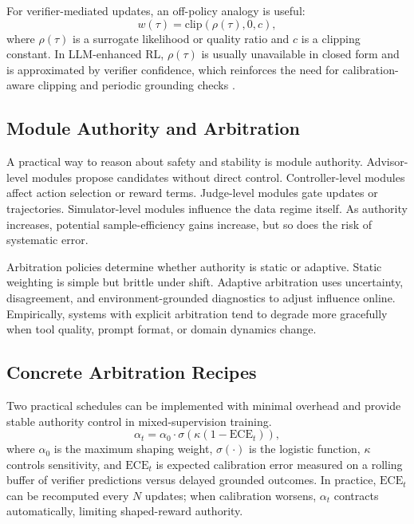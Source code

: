 \documentclass[pdflatex,sn-mathphys-num]{sn-jnl}
\begin{document}
For verifier-mediated updates, an off-policy analogy is useful:
\begin{equation}
w(\tau)=\mathrm{clip}\!\left(\rho(\tau),0,c\right),
\label{eq:clip_importance}
\end{equation}
where $\rho(\tau)$ is a surrogate likelihood or quality ratio and $c$ is a clipping constant. In LLM-enhanced RL, $\rho(\tau)$ is usually unavailable in closed form and is approximated by verifier confidence, which reinforces the need for calibration-aware clipping and periodic grounding checks \cite{arxiv_p_2602_06493,arxiv_p_2602_12579,arxiv_p_2508_03680}.

\subsection{Module Authority and Arbitration}
A practical way to reason about safety and stability is module authority. Advisor-level modules propose candidates without direct control. Controller-level modules affect action selection or reward terms. Judge-level modules gate updates or trajectories. Simulator-level modules influence the data regime itself. As authority increases, potential sample-efficiency gains increase, but so does the risk of systematic error.

Arbitration policies determine whether authority is static or adaptive. Static weighting is simple but brittle under shift. Adaptive arbitration uses uncertainty, disagreement, and environment-grounded diagnostics to adjust influence online. Empirically, systems with explicit arbitration tend to degrade more gracefully when tool quality, prompt format, or domain dynamics change.

\subsection{Concrete Arbitration Recipes}
Two practical schedules can be implemented with minimal overhead and provide stable authority control in mixed-supervision training.
\begin{equation}
\alpha_t=\alpha_0\cdot \sigma\!\left(\kappa\left(1-\mathrm{ECE}_t\right)\right),
\label{eq:alpha_recipe}
\end{equation}
where $\alpha_0$ is the maximum shaping weight, $\sigma(\cdot)$ is the logistic function, $\kappa$ controls sensitivity, and $\mathrm{ECE}_t$ is expected calibration error measured on a rolling buffer of verifier predictions versus delayed grounded outcomes. In practice, $\mathrm{ECE}_t$ can be recomputed every $N$ updates; when calibration worsens, $\alpha_t$ contracts automatically, limiting shaped-reward authority.
\end{document}
